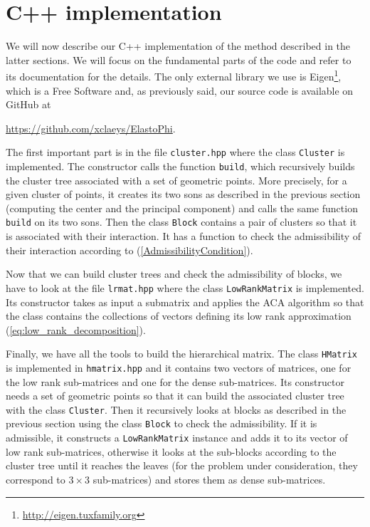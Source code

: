 


\section{C++ implementation}

We will now describe our C++ implementation of the method described in the latter sections. We will focus on the fundamental parts of the code and refer to its documentation for the details. The only external library we use is Eigen\footnote{\url{http://eigen.tuxfamily.org}}, which is a Free Software and, as previously said, our source code is available on GitHub at
\begin{center}
\url{https://github.com/xclaeys/ElastoPhi}.
\end{center}

The first important part is in the file \texttt{cluster.hpp} where the class \texttt{Cluster} is implemented. The constructor calls the function \texttt{build}, which recursively builds the cluster tree associated with a set of geometric points. More precisely, for a given cluster of points, it creates its two sons as described in the previous section (computing the center and the principal component) and calls the same function \texttt{build} on its two sons. Then the class \texttt{Block} contains a pair of clusters so that it is associated with their interaction. It has a function to check the admissibility of their interaction according to (\ref{AdmissibilityCondition}).

Now that we can build cluster trees and check the admissibility of blocks, we have to look at the file \texttt{lrmat.hpp} where the class \texttt{LowRankMatrix} is implemented. Its constructor takes as input a submatrix and applies the ACA algorithm so that the class contains the collections of vectors defining its low rank approximation (\ref{eq:low_rank_decomposition}).

Finally, we have all the tools to build the hierarchical matrix. The class \texttt{HMatrix} is implemented in \texttt{hmatrix.hpp} and it contains two vectors of matrices, one for the low rank sub-matrices and one for the dense sub-matrices. Its constructor needs a set of geometric points so that it can build the associated cluster tree with the class \texttt{Cluster}. Then it recursively looks at blocks as described in the previous section using the class \texttt{Block} to check the admissibility. If it is admissible, it constructs a \texttt{LowRankMatrix} instance and adds it to its vector of low rank sub-matrices, otherwise it looks at the sub-blocks according to the cluster tree until it reaches the leaves (for the problem under consideration, they correspond to $3 \times 3$ sub-matrices) and stores them as dense sub-matrices.

